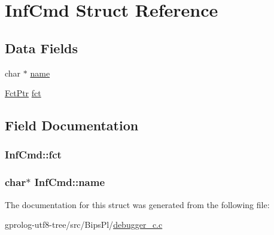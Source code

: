 \hypertarget{structInfCmd}{}\section{Inf\+Cmd Struct Reference}
\label{structInfCmd}
\subsection*{Data Fields}
\begin{DoxyCompactItemize}
\item 
char $\ast$ \hyperlink{structInfCmd_af3fea806d68a1051611b2858d1aa2747}{name}
\item 
\hyperlink{debugger__c_8c_a2bba3f250813e2d5aafc81daef57bb5f}{Fct\+Ptr} \hyperlink{structInfCmd_a4b390073530117560b83be4116a49e0b}{fct}
\end{DoxyCompactItemize}


\subsection{Field Documentation}
\subsubsection[{\texorpdfstring{fct}{fct}}]{ Inf\+Cmd\+::fct}\hypertarget{structInfCmd_a4b390073530117560b83be4116a49e0b}{}\label{structInfCmd_a4b390073530117560b83be4116a49e0b}
\subsubsection[{\texorpdfstring{name}{name}}]{\setlength{\rightskip}{0pt plus 5cm}char$\ast$ Inf\+Cmd\+::name}\hypertarget{structInfCmd_af3fea806d68a1051611b2858d1aa2747}{}\label{structInfCmd_af3fea806d68a1051611b2858d1aa2747}


The documentation for this struct was generated from the following file\+:\begin{DoxyCompactItemize}
\item 
gprolog-\/utf8-\/tree/src/\+Bips\+Pl/\hyperlink{debugger__c_8c}{debugger\+\_\+c.\+c}\end{DoxyCompactItemize}
